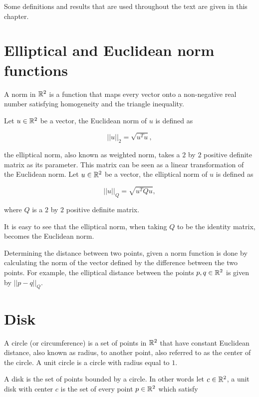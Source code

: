 Some definitions and results that are used throughout the text are given in this chapter.

\section{Elliptical and Euclidean norm functions}

A norm in $\mathbb{R}^2$ is a function that maps every vector onto a non-negative real number satisfying homogeneity and the triangle inequality. 

Let $u \in \mathbb{R}^2$ be a vector, the Euclidean norm of $u$ is defined as

\begin{equation}\label{eq:norm2}
||u||_2 = \sqrt{u^{T}u},
\end{equation}

\noindent the elliptical norm, also known as weighted norm, takes a $2$ by $2$ positive definite matrix as its parameter. This matrix can be seen as a linear transformation of the Euclidean norm. Let $u \in \mathbb{R}^2$ be a vector, the elliptical norm of $u$ is defined as 

\begin{equation}
||u||_{Q} = \sqrt{u^{T}Qu},
\end{equation}

\noindent where $Q$ is a $2$ by $2$ positive definite matrix.

It is easy to see that the elliptical norm, when taking $Q$ to be the identity matrix, becomes the Euclidean norm.

Determining the distance between two points, given a norm function is done by calculating the norm of the vector defined by the difference between the two points. For example, the elliptical distance between the points $p,q \in \mathbb{R}^2$ is given by $||p-q||_{Q}$.

\section{Disk}

A circle (or circumference) is a set of points in $\mathbb{R}^2$ that have constant Euclidean distance, also known as radius, to another point, also referred to as the center of the circle. A unit circle is a circle with radius equal to $1$.

A disk is the set of points bounded by a circle. In other words let $c \in \mathbb{R}^2$, a unit disk with center $c$ is the set of every point $p \in \mathbb{R}^2$ which satisfy

